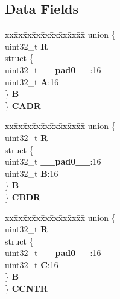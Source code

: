 \subsection*{Data Fields}
\begin{DoxyCompactItemize}
\item 
\mbox{\label{structEMIOS__tag_1_1EMIOS__CH__tag_ae2d734218fa6480eb8f230d638c9f2eb}} 
\begin{tabbing}
xx\=xx\=xx\=xx\=xx\=xx\=xx\=xx\=xx\=\kill
union \{\\
\>uint32\_t {\bfseries R}\\
\>struct \{\\
\>\>uint32\_t {\bfseries \_\_pad0\_\_}:16\\
\>\>uint32\_t {\bfseries A}:16\\
\>\} {\bfseries B}\\
\} {\bfseries CADR}\\

\end{tabbing}\item 
\mbox{\label{structEMIOS__tag_1_1EMIOS__CH__tag_a167c49bc5dff2795e1079f5d9f98f1f7}} 
\begin{tabbing}
xx\=xx\=xx\=xx\=xx\=xx\=xx\=xx\=xx\=\kill
union \{\\
\>uint32\_t {\bfseries R}\\
\>struct \{\\
\>\>uint32\_t {\bfseries \_\_pad0\_\_}:16\\
\>\>uint32\_t {\bfseries B}:16\\
\>\} {\bfseries B}\\
\} {\bfseries CBDR}\\

\end{tabbing}\item 
\mbox{\label{structEMIOS__tag_1_1EMIOS__CH__tag_acec0322d27eebab8c27027b83bc8926c}} 
\begin{tabbing}
xx\=xx\=xx\=xx\=xx\=xx\=xx\=xx\=xx\=\kill
union \{\\
\>uint32\_t {\bfseries R}\\
\>struct \{\\
\>\>uint32\_t {\bfseries \_\_pad0\_\_}:16\\
\>\>uint32\_t {\bfseries C}:16\\
\>\} {\bfseries B}\\
\} {\bfseries CCNTR}\\


\end{tabbing}
\end{DoxyCompactItemize}
